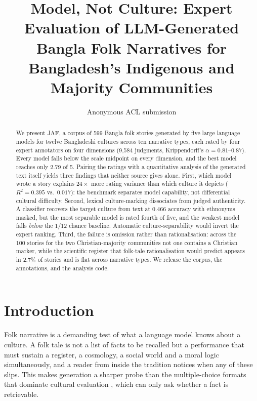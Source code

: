 \documentclass[11pt]{article}
\title{Model, Not Culture: Expert Evaluation of LLM-Generated Bangla Folk
Narratives for Bangladesh's Indigenous and Majority Communities}
\author{Anonymous ACL submission}
\begin{document}
\maketitle

\begin{abstract}
We present JAF, a corpus of 599 Bangla folk stories generated by five large
language models for twelve Bangladeshi cultures across ten narrative types,
each rated by four expert annotators on four dimensions
(9{,}584 judgments, Krippendorff's $\alpha = 0.81$--$0.87$).
Every model falls below the scale midpoint on every dimension, and the best
model reaches only 2.79 of 5. Pairing the ratings with a quantitative analysis
of the generated text itself yields three findings that neither source gives
alone. First, which model wrote a story explains $24\times$ more rating
variance than which culture it depicts ($R^2 = 0.395$ vs.\ $0.017$): the
benchmark separates model capability, not differential cultural difficulty.
Second, lexical culture-marking dissociates from judged authenticity. A
classifier recovers the target culture from text at $0.466$ accuracy with
ethnonyms masked, but the most separable model is rated fourth of five, and the
weakest model falls \emph{below} the $1/12$ chance baseline. Automatic
culture-separability would invert the expert ranking. Third, the failure is omission rather than
rationalisation: across the 100 stories for the two Christian-majority
communities not one contains a Christian marker, while the scientific register
that folk-tale rationalisation would predict appears in 2.7\% of stories and is
flat across narrative types. We release the corpus, the annotations, and the
analysis code.
\end{abstract}

\section{Introduction}

Folk narrative is a demanding test of what a language model knows about a
culture. A folk tale is not a list of facts to be recalled but a performance
that must sustain a register, a cosmology, a social world and a moral logic
simultaneously, and a reader from inside the tradition notices when any of
these slips. This makes generation a sharper probe than the
multiple-choice formats that dominate cultural evaluation
\cite{Myung2024,chiu-etal-2025-culturalbench,Etxaniz2024}, which can only ask
whether a fact is retrievable.
\end{document}
